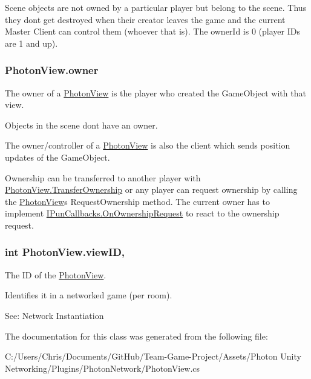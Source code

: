 Scene objects are not owned by a particular player but belong to the scene. Thus they don\textquotesingle{}t get destroyed when their creator leaves the game and the current Master Client can control them (whoever that is). The owner\+Id is 0 (player I\+Ds are 1 and up). 
\subsubsection[{\texorpdfstring{owner}{owner}}]{ Photon\+View.\+owner\hspace{0.3cm}{\ttfamily [get]}}\hypertarget{class_photon_view_ad696cb93fb9835d633b9def970650edc}{}\label{class_photon_view_ad696cb93fb9835d633b9def970650edc}


The owner of a \hyperlink{class_photon_view}{Photon\+View} is the player who created the Game\+Object with that view. 

Objects in the scene don\textquotesingle{}t have an owner. 

The owner/controller of a \hyperlink{class_photon_view}{Photon\+View} is also the client which sends position updates of the Game\+Object.

Ownership can be transferred to another player with \hyperlink{class_photon_view_a484df6eca8208330c00c317334dd8115}{Photon\+View.\+Transfer\+Ownership} or any player can request ownership by calling the \hyperlink{class_photon_view}{Photon\+View}\textquotesingle{}s Request\+Ownership method. The current owner has to implement \hyperlink{interface_i_pun_callbacks_a02364f5144b6305bbffc886d530b7bd2}{I\+Pun\+Callbacks.\+On\+Ownership\+Request} to react to the ownership request. 
\subsubsection[{\texorpdfstring{view\+ID}{viewID}}]{\setlength{\rightskip}{0pt plus 5cm}int Photon\+View.\+view\+ID\hspace{0.3cm}{\ttfamily [get]}, {\ttfamily [set]}}\hypertarget{class_photon_view_a309ddedb443400696cf80da2ff579262}{}\label{class_photon_view_a309ddedb443400696cf80da2ff579262}


The ID of the \hyperlink{class_photon_view}{Photon\+View}. 

Identifies it in a networked game (per room). 

See\+: Network Instantiation

The documentation for this class was generated from the following file\+:\begin{DoxyCompactItemize}
\item 
C\+:/\+Users/\+Chris/\+Documents/\+Git\+Hub/\+Team-\/\+Game-\/\+Project/\+Assets/\+Photon Unity Networking/\+Plugins/\+Photon\+Network/Photon\+View.\+cs\end{DoxyCompactItemize}
